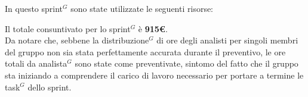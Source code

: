 In questo sprint$^G$ sono state utilizzate le seguenti risorse:
\begin{table}[H]
	\centering
	\caption{Sprint 4: Consuntivo}
\end{table}
Il totale consuntivato per lo sprint$^G$ è \textbf{915€}.\\

Da notare che, sebbene la distribuzione$^G$ di ore degli analisti per singoli membri del gruppo non sia stata perfettamente accurata durante il preventivo, le ore totali da analista$^G$ sono state come preventivate, sintomo del fatto che il gruppo sta iniziando a comprendere il carico di lavoro necessario per portare a termine le task$^G$ dello sprint. 

